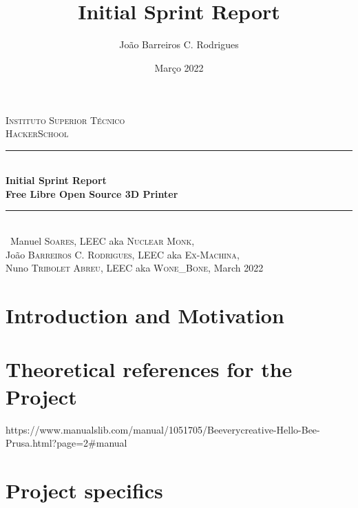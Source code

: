 \documentclass[a4paper,12pt]{article}
\date{Março 2022}
\title{ \\ \large {Initial Sprint Report}}
\author{João Barreiros C. Rodrigues}
\begin{document}
	\begin{titlepage} %
        \newcommand{\HRule}{\rule{\linewidth}{0.5mm}} %
        \center %
        \textsc{\LARGE Instituto Superior Técnico}\\[1.5cm] %
	\textsc{\Large HackerSchool}\\[0.25cm]
        \HRule\\[0.4cm]
        {\LARGE\bfseries Initial Sprint Report}\\[0.4cm] %
	{\huge\bfseries Free Libre Open Source 3D Printer}\\[0.4cm] %
        \HRule\\[1.5cm]\
	Manuel \textsc{Soares}, LEEC aka \textsc{Nuclear Monk},\\
        João \textsc{Barreiros C. Rodrigues}, LEEC aka \textsc{Ex-Machina},\\
	Nuno \textsc{Tribolet Abreu}, LEEC aka \textsc{Wone\_Bone},
        \vfill\vfill\vfill %
        {\large March 2022} %
        \vfill %
\end{titlepage}
	\newpage
		\tableofcontents
	\section{Introduction and Motivation}
	
	\section{Theoretical references for the Project}
	https://www.manualslib.com/manual/1051705/Beeverycreative-Hello-Bee-Prusa.html?page=2#manual \par
	\clearpage	
	\section{Project specifics}
		
\end{document}
